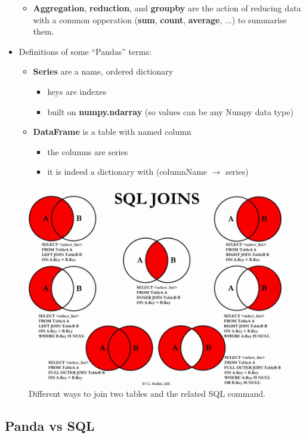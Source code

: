 \documentclass[a4paper,11pt,twoside]{article}
\begin{document}
\begin{itemize}
\begin{itemize}
  \item \textbf{Aggregation}, \textbf{reduction}, and {\bf groupby} are the action of reducing data with a common opperation (\textbf{sum}, \textbf{count}, \textbf{average}, ...) to summarise them. 
 \end{itemize}
 \item Definitions of some ``Pandas'' terms:
 \begin{itemize}
  \item {\bf Series} are a name, ordered dictionary
  \begin{itemize}
   \item keys are indexes
   \item built on \textbf{numpy.ndarray} (so values can be any Numpy data type)
  \end{itemize}  
  \item \textbf{DataFrame} is a table with named column
  \begin{itemize}
   \item the columns are series
   \item it is indeed a dictionary with (columnName $\rightarrow$ series)
  \end{itemize}  
 \end{itemize}
\end{itemize}

\begin{figure}%
 \centering
 \includegraphics[width=12cm]{./pic/SQL_joins}
 \caption{\label{join_SQL} Different ways to join two tables and the related SQL command.}
\end{figure}


\subsection{Panda vs SQL}
\end{document}

